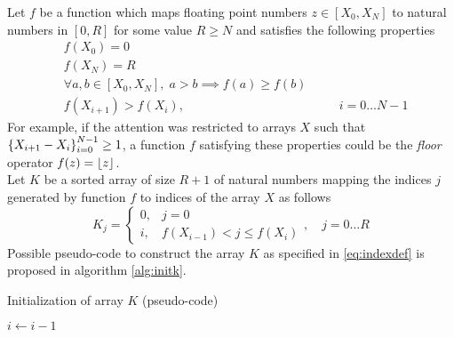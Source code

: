 \documentclass[preprint,1p,times]{elsarticle}
\begin{document}
Let $f$ be a function which maps floating point numbers $z\in[X_{0},X_{N}]$ to natural numbers in $[0,R]$ for some value $R \geq N$ and satisfies the following properties
\begin{subequations}
\label{eq:fprop}
\begin{align}
&f(X_0)=0 \\
&f(X_N)=R \label{eq:lastf} \\
&\forall a,b \in[X_{0},X_{N}], \; a>b \implies f(a) \geq f(b) \label{eq:monotonic} \\
&f(X_{i+1}) > f(X_i), &&\quad  i=0 \dots N-1 \label{eq:f-monotonic}
\end{align}
\end{subequations}
For example, if the attention was restricted to arrays $X$ such that $\left \{ X_{i+1}-X_i \right \}_{i=0}^{N-1} \geq 1$, a function $f$ satisfying these properties could be the \textit{floor} operator $f(z)=\left \lfloor z \right \rfloor$. \\
Let $K$ be a sorted array of size $R+1$ of natural numbers mapping the indices $j$ generated by function $f$ to indices of the array $X$ as follows
\begin{equation}
\label{eq:indexdef}
K_{j}=\left\{ 
	\begin{array}{ll}
		0, & j=0 \\
		i, & f(X_{i-1}) < j \leq f(X_i)
	\end{array}, \quad j=0\dots R
\right.
\end{equation}
Possible pseudo-code to construct the array $K$ as specified in \eqref{eq:indexdef} is proposed in algorithm \eqref{alg:initk}.
\begin{algorithm}[ht]
	\caption{Initialization of array $K$ (pseudo-code)}
	\label{alg:initk}
	\begin{algorithmic}
		\Repeat
			  
			\EndWhile

			   		
		
			\State $i \leftarrow i-1$
		\EndFunction
	\end{algorithmic}
\end{algorithm}
\end{document}
